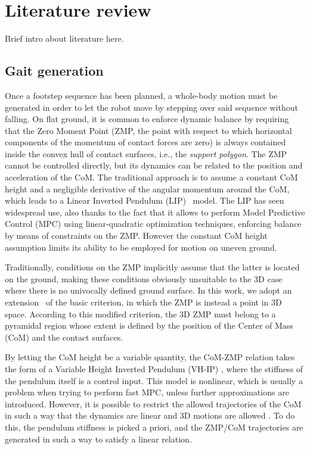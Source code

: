 \chapter{Literature review}
Brief intro about literature here.

\section{Gait generation}

Once a footstep sequence has been planned, a whole-body motion must be generated in order to let the robot move by stepping over said sequence without falling. On flat ground, it is common to enforce dynamic balance by requiring that the Zero Moment Point (ZMP, the point with respect to which horizontal components of the momentum of contact forces are zero) is always contained inside the convex hull of contact surfaces, i.e., the \emph{support polygon}.
The ZMP cannot be controlled directly, but its dynamics can be related to the position and acceleration of the CoM. The traditional approach is to assume a constant CoM height and a negligible derivative of the angular momentum around the CoM, which leads to a Linear Inverted Pendulum (LIP)~\cite{KaKaKaFuHaYoHi:03} model. The LIP has seen widespread use, also thanks to the fact that it allows to perform Model Predictive Control (MPC) using linear-quadratic optimization techniques, enforcing balance by means of constraints on the ZMP. However the constant CoM height assumption limits its ability to be employed for motion on uneven ground.

Traditionally, conditions on the ZMP implicitly assume that the latter is located on the ground, making these conditions obviously unsuitable to the 3D case where there is no univocally defined ground surface. In this work, we adopt an extension~\cite{SuImYaCa:2021} of the basic criterion, in which the ZMP is instead a point in 3D space. According to this modified criterion, the 3D ZMP must belong to a pyramidal region whose extent is defined by the position of the Center of Mass (CoM) and the contact surfaces.

By letting the CoM height be a variable quantity, the CoM-ZMP relation takes the form of a Variable Height Inverted Pendulum (VH-IP) \cite{CaEdLaMa:18}, where the stiffness of the pendulum itself is a control input. This model is nonlinear, which is usually a problem when trying to perform fast MPC, unless further approximations are introduced. However, it is possible to restrict the allowed trajectories of the CoM in such a way that the dynamics are linear and 3D motions are allowed \cite{ZaScLaOr:18, FeScLaOr:19}. To do this, the pendulum stiffness is picked a priori, and the ZMP/CoM trajectories are generated in such a way to satisfy a linear relation.

